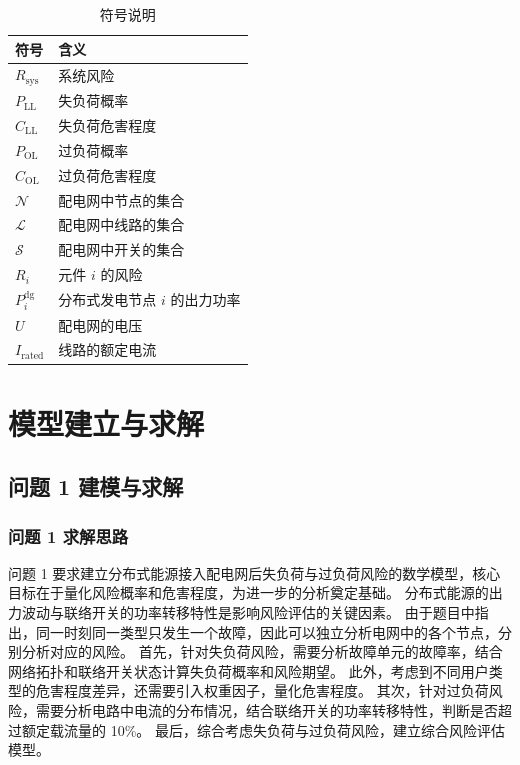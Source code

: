 \documentclass{article}
\begin{document}
\begin{table}[H]
  \centering
  \begin{tabular}{>{\centering\arraybackslash}p{}>{\centering\arraybackslash}p{}}
    \toprule
    符号 & 含义 \\
    \midrule
    $R_{\text{sys}}$ & 系统风险 \\
    $P_{\text{LL}}$ & 失负荷概率 \\
    $C_{\text{LL}}$ & 失负荷危害程度 \\
    $P_{\text{OL}}$ & 过负荷概率 \\
    $C_{\text{OL}}$ & 过负荷危害程度 \\
    $\mathcal{N}$ & 配电网中节点的集合 \\
    $\mathcal{L}$ & 配电网中线路的集合 \\
    $\mathcal{S}$ & 配电网中开关的集合 \\
    $R_i$ & 元件 $i$ 的风险 \\
    $P_i^{\text{dg}}$ & 分布式发电节点 $i$ 的出力功率 \\
    $U$ & 配电网的电压 \\
    $I_{\text{rated}}$ & 线路的额定电流 \\
    \bottomrule
  \end{tabular}
  \caption{符号说明}
  \label{tab:notation}
\end{table}

\section{模型建立与求解}\label{sec:model}

\subsection{问题 1 建模与求解}\label{subsec:problem1}

\subsubsection{问题 1 求解思路}\label{subsubsec:problem1_idea}

问题 1 要求建立分布式能源接入配电网后失负荷与过负荷风险的数学模型，核心目标在于量化风险概率和危害程度，为进一步的分析奠定基础。
分布式能源的出力波动与联络开关的功率转移特性是影响风险评估的关键因素。
由于题目中指出，同一时刻同一类型只发生一个故障，因此可以独立分析电网中的各个节点，分别分析对应的风险。
首先，针对失负荷风险，需要分析故障单元的故障率，结合网络拓扑和联络开关状态计算失负荷概率和风险期望。
此外，考虑到不同用户类型的危害程度差异，还需要引入权重因子，量化危害程度。
其次，针对过负荷风险，需要分析电路中电流的分布情况，结合联络开关的功率转移特性，判断是否超过额定载流量的 10\%。
最后，综合考虑失负荷与过负荷风险，建立综合风险评估模型。
\end{document}
